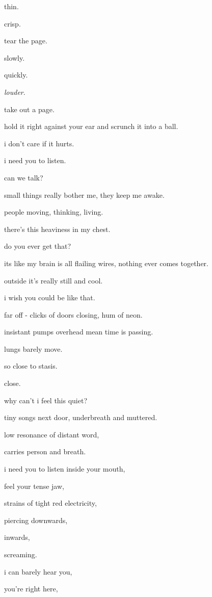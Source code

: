 \documentclass{article}
\begin{document}
	thin.

	crisp.\newpage

	tear the page.

	slowly.

	quickly.

	\emph{louder}.

	\newpage

	take out a page.

	hold it right against your ear and scrunch it into a ball.

	i don't care if it hurts.

	i need you to listen.

	\newpage

	can we talk?

	\newpage

	small things really bother me, they keep me awake.

	people moving, thinking, living.

	\newpage

	there's this heaviness in my chest.

	do you ever get that?

	its like my brain is all flailing wires, nothing ever comes together.

	outside it's really still and cool.\newpage

	i wish you could be like that.\newpage

	far off - clicks of doors closing, hum of neon.

	insistant pumps overhead mean time is passing.

	lungs barely move.

	so close to stasis.

	close.\newpage

	why can't i feel this quiet?\newpage

	tiny songs next door, underbreath and muttered.

	low resonance of distant word,

	carries person and breath.\newpage

	i need you to listen inside your mouth,

	feel your tense jaw, 

	strains of tight red electricity,

	piercing downwards,

	inwards,

	screaming.\newpage

	i can barely hear you,

	you're right here,
\end{document}
